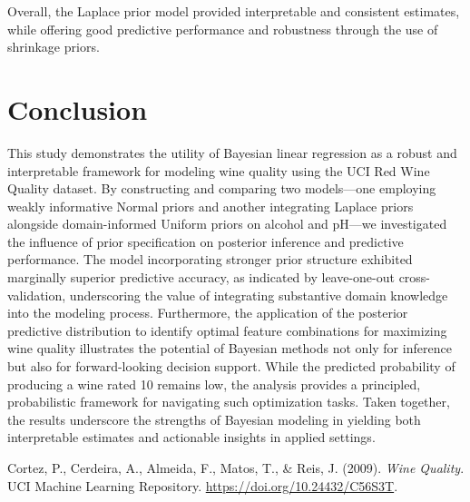 \documentclass[12pt]{article}
\begin{document}
    Overall, the Laplace prior model provided interpretable and consistent estimates, while offering good predictive performance and robustness through the use of shrinkage priors.

\section{Conclusion}

This study demonstrates the utility of Bayesian linear regression as a robust and interpretable framework for modeling wine quality using the UCI Red Wine Quality dataset. By constructing and comparing two models—one employing weakly informative Normal priors and another integrating Laplace priors alongside domain-informed Uniform priors on alcohol and pH—we investigated the influence of prior specification on posterior inference and predictive performance. The model incorporating stronger prior structure exhibited marginally superior predictive accuracy, as indicated by leave-one-out cross-validation, underscoring the value of integrating substantive domain knowledge into the modeling process. Furthermore, the application of the posterior predictive distribution to identify optimal feature combinations for maximizing wine quality illustrates the potential of Bayesian methods not only for inference but also for forward-looking decision support. While the predicted probability of producing a wine rated 10 remains low, the analysis provides a principled, probabilistic framework for navigating such optimization tasks. Taken together, the results underscore the strengths of Bayesian modeling in yielding both interpretable estimates and actionable insights in applied settings.



\begin{thebibliography}{9}

Cortez, P., Cerdeira, A., Almeida, F., Matos, T., \& Reis, J. (2009). \textit{Wine Quality}. UCI Machine Learning Repository. \url{https://doi.org/10.24432/C56S3T}.

\end{thebibliography}
\end{document}
